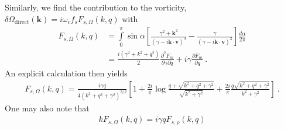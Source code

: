 \documentclass[preprint,aps,eqsecnum]{revtex4-1}
\newcommand{\dct}[1]{{#1}_\mathrm{direct}}
\begin{document}
Similarly, we find the contribution to the vorticity,
$\delta\dct{\Omega}({\bm k}) = i \omega_c f_s F_{s, \Omega}(k, q)$
with
\begin{align}
  F_{s, \Omega}(k, q) &= \int\limits_{0}^{\pi}
  \sin\alpha \left[ \frac{\gamma^2 + {\bm k}^2}{
          \left(\gamma - i {\bm k}\cdot{\bm v}\right)^3}
  - \frac{\gamma}{ \left(\gamma - i {\bm k}\cdot{\bm v}\right)^2}
  \right] \frac{d\alpha}{2\pi} \\
  &= \frac{i(\gamma^2 + k^2 + q^2)}{2}
  \frac{\partial^2 F_m}{\partial\gamma \partial q}
  + i \gamma \frac{\partial F_m}{\partial q}\ . 
\end{align}
An explicit calculation then yields
\begin{align}
  F_{s, \Omega}(k, q) =
 \frac{i \gamma q}{4(k^2 + q^2 + \gamma^2)^{3/2}}
  \left[1 + \frac{2i}{\pi} \log \frac{q + \sqrt{k^2 + q^2 + \gamma^2}}{
                          \sqrt{k^2 + \gamma^2}}
  + \frac{2i}{\pi} \frac{q\sqrt{k^2 + q^2 + \gamma^2}}{k^2 + \gamma^2}
  \right]\ . 
\end{align}
One may also note that
\begin{align}
  k F_{s, \Omega}(k, q) = i \gamma q F_{s, \rho}(k, q)
\end{align}
\end{document}
